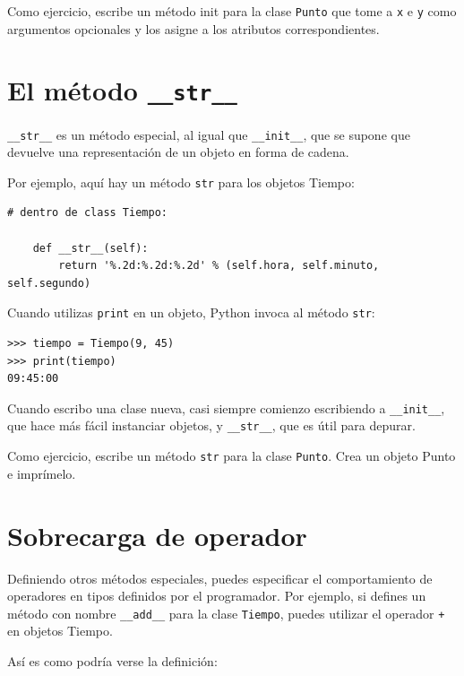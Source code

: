 \documentclass[10pt]{book}
\begin{document}
Como ejercicio, escribe un método init para la clase {\tt Punto} que tome a
{\tt x} e {\tt y} como argumentos opcionales y los asigne
a los atributos correspondientes.


\section{El método {\tt \_\_str\_\_}}

\verb"__str__" es un método especial, al igual que \verb"__init__",
que se supone que devuelve una representación de un objeto en forma de cadena.

Por ejemplo, aquí hay un método {\tt str} para los objetos Tiempo:

\begin{verbatim}
# dentro de class Tiempo:

    def __str__(self):
        return '%.2d:%.2d:%.2d' % (self.hora, self.minuto, self.segundo)
\end{verbatim}
%
Cuando utilizas {\tt print} en un objeto, Python invoca al método {\tt str}:

\begin{verbatim}
>>> tiempo = Tiempo(9, 45)
>>> print(tiempo)
09:45:00
\end{verbatim}
%
Cuando escribo una clase nueva, casi siempre comienzo escribiendo a
\verb"__init__", que hace más fácil instanciar objetos, y
\verb"__str__", que es útil para depurar.

Como ejercicio, escribe un método {\tt str} para la clase {\tt Punto}.
Crea un objeto Punto e imprímelo.


\section{Sobrecarga de operador}
\label{operator.overloading}

Definiendo otros métodos especiales, puedes especificar el comportamiento
de operadores en tipos definidos por el programador.  Por ejemplo, si defines
un método con nombre \verb"__add__" para la clase {\tt Tiempo}, puedes utilizar el
operador {\tt +} en objetos Tiempo.

Así es como podría verse la definición:
\end{document}
